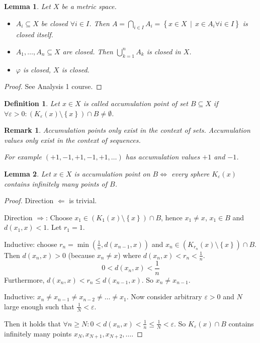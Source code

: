 \documentclass{article}
\newtheorem{definition}{Definition}  \numberwithin{definition}{section}
\newtheorem{lemma}{Lemma}  \numberwithin{lemma}{section}
\newtheorem{remark}{Remark}  \numberwithin{remark}{section}
\newcommand{\set}[1]{\left\{#1\right\}}
\newcommand{\setdef}[2]{\left\{\left.#1\,\middle|\,#2\right.\right\}}
\begin{document}
\begin{lemma}
  \label{lemma4}
  Let $X$ be a metric space.
  \begin{itemize}
    \item
      $A_i \subseteq X$ be closed $\forall i \in I$.
      Then $A = \bigcap_{i \in I} A_i = \setdef{x \in X}{x \in A_i \forall i \in I}$
      is closed itself.
    \item
      $A_1, \dots, A_n \subseteq X$ are closed. Then $\bigcup_{k=1}^n A_k$ is closed in $X$.
    \item
      $\varphi$ is closed, $X$ is closed.
  \end{itemize}
\end{lemma}

\begin{proof}
  See Analysis 1 course.
\end{proof}

\begin{definition} %
  Let $x \in X$ is called accumulation point of set $B \subseteq X$ if $\forall \varepsilon > 0: (K_{\varepsilon}(x) \setminus \set{x}) \cap B \neq \emptyset$.
\end{definition}

\begin{remark}
  Accumulation \emph{points} only exist in the context of \emph{sets}.
  Accumulation \emph{values} only exist in the context of \emph{sequences}.

  For example $(+1, -1, +1, -1, +1, \dots)$ has accumulation \emph{values} $+1$ and $-1$.
\end{remark}

\begin{lemma}
  Let $x \in X$ is accumulation point on $B \iff$ every sphere $K_{\varepsilon}(x)$ contains infinitely many points of $B$.
\end{lemma}
\begin{proof}
  Direction $\Leftarrow$ is trivial.

  Direction $\Rightarrow$:
  Choose $x_1 \in (K_1(x) \setminus \set{x}) \cap B$, hence $x_1 \neq x$, $x_1 \in B$ and $d(x_1, x) < 1$.
  Let $r_1 = 1$.

  Inductive: choose $r_n = \min(\frac1n, d(x_{n-1}, x))$ and $x_n \in (K_{r_n}(x) \setminus \set{x}) \cap B$.
  Then $d(x_n, x) > 0$ (because $x_n \neq x$) where $d(x_n, x) < r_n < \frac1n$.
  \[ 0 < d(x_n, x) < \frac1n \]
  Furthermore, $d(x_n, x) < r_n \leq d(x_{n-1}, x)$.
  So $x_n \neq x_{n-1}$.

  Inductive: $x_n \neq x_{n-1} \neq x_{n-2} \neq \dots \neq x_1$.
  Now consider arbitrary $\varepsilon > 0$ and $N$ large enough such that $\frac1N < \varepsilon$.

  Then it holds that $\forall n \geq N: 0 < d(x_n, x) < \frac1n \leq \frac1N < \varepsilon$.
  So $K_{\varepsilon}(x) \cap B$ contains infinitely many points $x_N, x_{N+1}, x_{N+2}, \dots$.
\end{proof}
\end{document}
